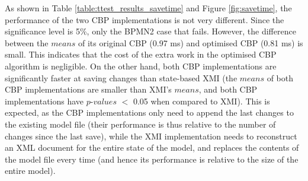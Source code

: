 {As shown in Table \ref{table:ttest_results_savetime} and Figure \ref{fig:savetime}, the performance of the two CBP implementations is not very different. Since the significance level is 5\%, only the BPMN2 case that fails. However, the difference between the $means$ of its original CBP (0.97 ms) and optimised CBP (0.81 ms) is small. This indicates that the cost of the extra work in the optimised CBP algorithm is negligible. On the other hand, both CBP implementations are significantly faster at saving changes than state-based XMI (the $means$ of both CBP implementations are smaller than XMI's $means$, and both CBP implementations have $p$-$values$ $<$ 0.05 when compared to XMI). This is expected, as the CBP implementations only need to append the last changes to the existing model file (their performance is thus relative to the number of changes since the last save), while the XMI implementation needs to reconstruct an XML document for the entire state of the model, and replaces the contents of the model file every time (and hence its performance is relative to the size of the entire model). 

}
